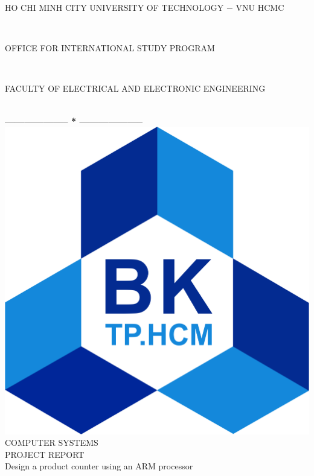 \documentclass[a4paper,twoside]{report}
\begin{document}
\fontsize{13pt}{18pt}\selectfont
\begin{titlepage}

\begin{center}
\begin{large}
HO CHI MINH CITY UNIVERSITY OF TECHNOLOGY $-$ VNU HCMC
\end{large} \\
\begin{large}
OFFICE FOR INTERNATIONAL STUDY PROGRAM
\end{large} \\
\begin{large}
FACULTY OF ELECTRICAL AND ELECTRONIC ENGINEERING
\end{large} \\
\textbf{--------------------  *  --------------------}\\[2.5cm]
\includegraphics[scale=0.1]{logobk.png}\\[1cm]
{\fontsize{20pt}{1}\selectfont 	COMPUTER SYSTEMS}\\[0.2cm]
{\fontsize{20pt}{1}\selectfont PROJECT REPORT}\\[0.2cm]
{\fontsize{20pt}{1}\selectfont Design a product counter using an ARM processor}\\[2.5cm]
\end{center}


\end{titlepage}
\end{document}
